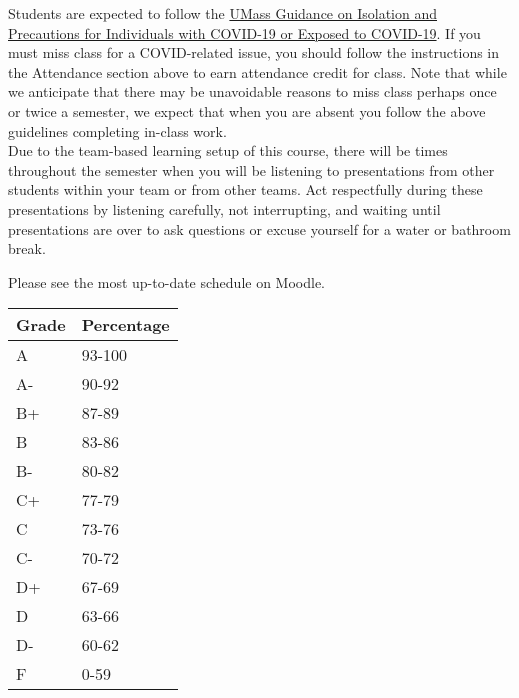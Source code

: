 \documentclass[10pt]{article}
\begin{document}
 Students are expected to follow the \href{https://www.umass.edu/coronavirus/isolation-and-quarantine-guide}{UMass Guidance on Isolation and Precautions for Individuals with COVID-19 or Exposed to COVID-19}. If you must miss class for a COVID-related issue, you should follow the instructions in the Attendance section above to earn attendance credit for class. Note that while we anticipate that there may be unavoidable reasons to miss class perhaps once or twice a semester, we expect that when you are absent you follow the above guidelines completing in-class work. \\


 Due to the team-based learning setup of this course, there will be times throughout the semester when you will be listening to presentations from other students within your team or from other teams. Act respectfully during these presentations by listening carefully, not interrupting, and waiting until presentations are over to ask questions or excuse yourself for a water or bathroom break.\\

%
%


Please see the most up-to-date schedule on Moodle.

\clearpage

\begin{table}[htp]
\begin{tabular}{ll}
Grade & Percentage \\
\hline
A & 93-100 \\
A- & 90-92 \\
B+ & 87-89 \\
B & 83-86 \\
B- & 80-82 \\
C+ & 77-79 \\
C & 73-76 \\
C- & 70-72 \\
D+ & 67-69 \\
D & 63-66 \\
D- & 60-62\\
F & 0-59 \\
\end{tabular}
\end{table}%
\end{document}

